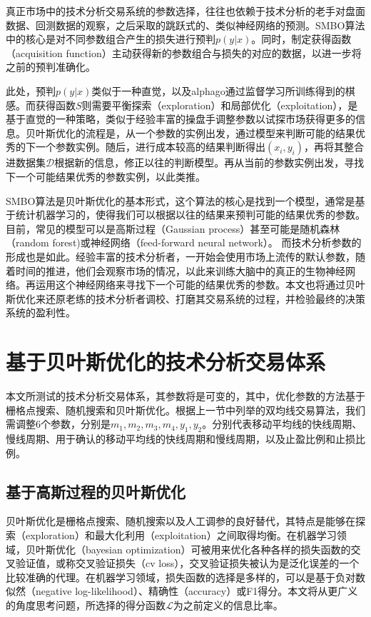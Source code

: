 \documentclass[twoside,longtitle]{LZUthesis}
\begin{document}
真正市场中的技术分析交易系统的参数选择，往往也依赖于技术分析的老手对盘面数据、回测数据的观察，之后采取的跳跃式的、类似神经网络的预测。SMBO算法中的核心是对不同参数组合产生的损失进行预判$p(y|x)$。同时，制定获得函数（acquisition function）主动获得新的参数组合与损失的对应的数据，以进一步将之前的预判准确化。

此处，预判$p(y|x)$类似于一种直觉，以及alphago通过监督学习所训练得到的棋感。而获得函数$S$则需要平衡探索（exploration）和局部优化（exploitation），是基于直觉的一种策略，类似于经验丰富的操盘手调整参数以试探市场获得更多的信息。贝叶斯优化的流程是，从一个参数的实例出发，通过模型来判断可能的结果优秀的下一个参数实例。随后，进行成本较高的结果判断得出$(x_i,y_i)$，再将其整合进数据集$\mathcal{D}$根据新的信息，修正以往的判断模型。再从当前的参数实例出发，寻找下一个可能结果优秀的参数实例，以此类推。

SMBO算法是贝叶斯优化的基本形式，这个算法的核心是找到一个模型，通常是基于统计机器学习的，使得我们可以根据以往的结果来预判可能的结果优秀的参数。目前，常见的模型可以是高斯过程（Gaussian process）甚至可能是随机森林（random forest)或神经网络（feed-forward neural network）。
而技术分析参数的形成也是如此。经验丰富的技术分析者，一开始会使用市场上流传的默认参数，随着时间的推进，他们会观察市场的情况，以此来训练大脑中的真正的生物神经网络。再运用这个神经网络来寻找下一个可能的结果优秀的参数。本文也将通过贝叶斯优化来还原老练的技术分析者调校、打磨其交易系统的过程，并检验最终的决策系统的盈利性。

\section{基于贝叶斯优化的技术分析交易体系}
本文所测试的技术分析交易体系，其参数将是可变的，其中，优化参数的方法基于栅格点搜索、随机搜索和贝叶斯优化。根据上一节中列举的双均线交易算法，我们需调整6个参数，分别是$m_1,m_2,m_3,m_4,y_1,y_2$。分别代表移动平均线的快线周期、慢线周期、用于确认的移动平均线的快线周期和慢线周期，以及止盈比例和止损比例。

\subsection{基于高斯过程的贝叶斯优化}
贝叶斯优化\cite{Pelikan2005Bayesian}是栅格点搜索、随机搜索以及人工调参的良好替代，其特点是能够在探索（exploration）和最大化利用（exploitation）之间取得均衡。在机器学习领域，贝叶斯优化（bayesian optimization）可被用来优化各种各样的损失函数的交叉验证值，或称交叉验证损失（cv loss），交叉验证损失被认为是泛化误差的一个比较准确的代理\cite{Arlot2009A}。在机器学习领域，损失函数的选择是多样的，可以是基于负对数似然（negative log-likelihood）、精确性（accuracy）或F1得分。本文将从更广义的角度思考问题，所选择的得分函数$\mathcal{L}$为之前定义的信息比率。
\end{document}
